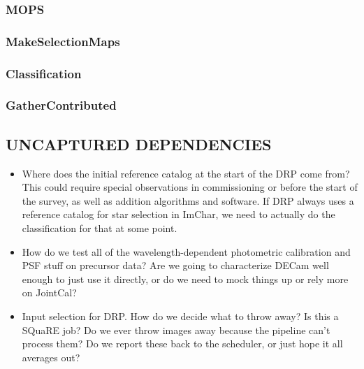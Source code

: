 \subsubsection{MOPS}
\label{sec:drpMOPS}
\subsubsection{MakeSelectionMaps}
\label{sec:drpMakeSelectionMaps}
\subsubsection{Classification}
\label{sec:drpClassification}
\subsubsection{GatherContributed}
\label{sec:drpGatherContributed}

\subsection{UNCAPTURED DEPENDENCIES}

\begin{itemize}
\item Where does the initial reference catalog at the start of the DRP come from?  This could require special observations in commissioning or before the start of the survey, as well as addition algorithms and software.  If DRP always uses a reference catalog for star selection in ImChar, we need to actually do the classification for that at some point.
\item How do we test all of the wavelength-dependent photometric calibration and PSF stuff on precursor data?  Are we going to characterize DECam well enough to just use it directly, or do we need to mock things up or rely more on JointCal?
\item Input selection for DRP.  How do we decide what to throw away?  Is this a SQuaRE job?  Do we ever throw images away because the pipeline can't process them?  Do we report these back to the scheduler, or just hope it all averages out?
\end{itemize}

